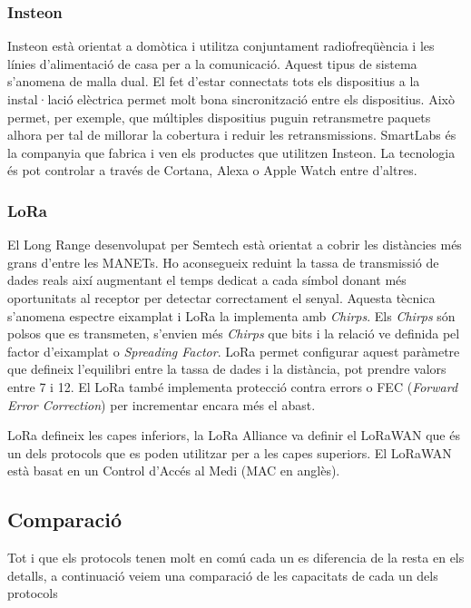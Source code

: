 \subsubsection{Insteon}
Insteon està orientat a domòtica i utilitza conjuntament radiofreqüència i les línies d'alimentació de casa per a la comunicació.
Aquest tipus de sistema s'anomena de malla dual.
El fet d'estar connectats tots els dispositius a la instal·lació elèctrica permet molt bona sincronització entre els dispositius.
Això permet, per exemple, que múltiples dispositius puguin retransmetre paquets alhora per tal de millorar la cobertura i reduir les retransmissions.
SmartLabs és la companyia que fabrica i ven els productes que utilitzen Insteon.
La tecnologia és pot controlar a través de Cortana, Alexa o Apple Watch entre d'altres.

\subsubsection{LoRa}
El Long Range desenvolupat per Semtech està orientat a cobrir les distàncies més grans d'entre les MANETs.
Ho aconsegueix reduint la tassa de transmissió de dades reals així augmentant el temps dedicat a cada símbol donant més oportunitats al receptor per detectar correctament el senyal.
Aquesta tècnica s'anomena espectre eixamplat i LoRa la implementa amb \textit{Chirps}.
Els \textit{Chirps} són polsos que es transmeten, s'envien més \textit{Chirps} que bits i la relació ve definida pel factor d'eixamplat o \textit{Spreading Factor}.
LoRa permet configurar aquest paràmetre que defineix l'equilibri entre la tassa de dades i la distància, pot prendre valors entre 7 i 12.
El LoRa també implementa protecció contra errors o FEC (\textit{Forward Error Correction}) per incrementar encara més el abast.

LoRa defineix les capes inferiors, la LoRa Alliance va definir el LoRaWAN que és un dels protocols que es poden utilitzar per a les capes superiors. El LoRaWAN està basat en un Control d'Accés al Medi (MAC en anglès).


\subsection{Comparació}
Tot i que els protocols tenen molt en comú cada un es diferencia de la resta en els detalls, a continuació veiem una comparació de les capacitats de cada un dels protocols

